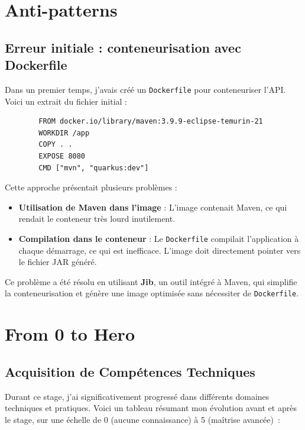\documentclass{article}
\begin{document}
	\newpage
	\section{Anti-patterns}
	\subsection{Erreur initiale : conteneurisation avec Dockerfile}
	Dans un premier temps, j'avais créé un \texttt{Dockerfile} pour conteneuriser l'API. Voici un extrait du fichier initial :
	\begin{verbatim}
		FROM docker.io/library/maven:3.9.9-eclipse-temurin-21
		WORKDIR /app
		COPY . .
		EXPOSE 8080
		CMD ["mvn", "quarkus:dev"]
	\end{verbatim}
	
	Cette approche présentait plusieurs problèmes :
	\begin{itemize}
		\item \textbf{Utilisation de Maven dans l'image} : L'image contenait Maven, ce qui rendait le conteneur très lourd inutilement.
		\item \textbf{Compilation dans le conteneur} : Le \texttt{Dockerfile} compilait l'application à chaque démarrage, ce qui est inefficace. L'image doit directement pointer vers le fichier JAR généré.
	\end{itemize}
	
	Ce problème a été résolu en utilisant \textbf{Jib}, un outil intégré à Maven, qui simplifie la conteneurisation et génère une image optimisée sans nécessiter de \texttt{Dockerfile}.
	
	\newpage
	\section{From 0 to Hero}
	
	\subsection{Acquisition de Compétences Techniques}
	
	Durant ce stage, j'ai significativement progressé dans différents domaines techniques et pratiques. Voici un tableau résumant mon évolution avant et après le stage, sur une échelle de 0 (aucune connaissance) à 5 (maîtrise avancée) :
	
\end{document}
